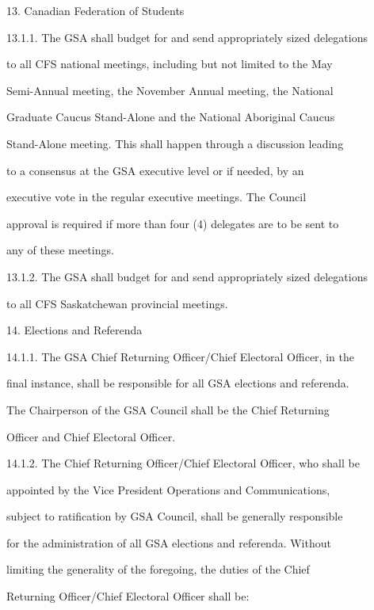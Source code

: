\documentclass{article}
\begin{document}
13.  Canadian Federation of Students  



13.1.1.     The GSA shall budget for and send appropriately sized delegations  

to  all  CFS  national  meetings,  including  but  not  limited  to  the  May  

Semi-Annual  meeting,  the  November  Annual  meeting,  the  National  

Graduate  Caucus  Stand-Alone  and  the  National  Aboriginal  Caucus  

Stand-Alone meeting. This shall happen through a discussion leading  

to  a  consensus  at  the  GSA  executive  level  or  if  needed,  by  an  

executive   vote   in   the   regular   executive   meetings.   The   Council  

approval is required if more than four (4) delegates are to be sent to  

any of these meetings.  



13.1.2.     The GSA shall budget  for and send appropriately sized delegations  

to all CFS Saskatchewan provincial meetings.  



14.  Elections and Referenda  



14.1.1.     The  GSA  Chief  Returning  Officer/Chief  Electoral  Officer,  in  the  

final instance, shall be responsible for all GSA elections and referenda.  

The  Chairperson  of  the  GSA  Council  shall  be  the  Chief  Returning  

Officer and Chief Electoral Officer.  



14.1.2.     The Chief Returning Officer/Chief Electoral Officer, who shall be  

appointed  by  the  Vice  President  Operations  and  Communications,  

subject to ratification by GSA Council, shall be generally responsible  

for  the  administration  of  all  GSA  elections  and  referenda.  Without  

limiting  the  generality  of  the  foregoing,  the  duties  of  the  Chief  

Returning Officer/Chief Electoral Officer shall be:  
\end{document}
